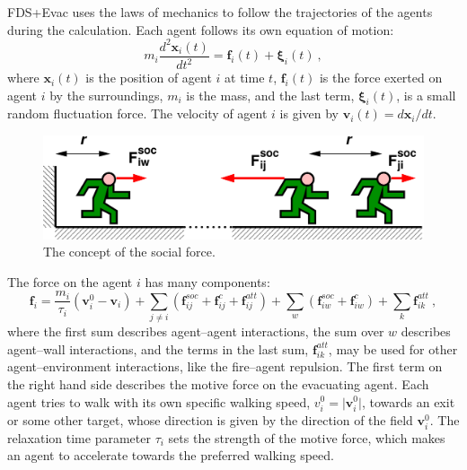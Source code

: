\documentclass[12pt,a4paper,final,twoside]{stylevk}
\begin{document}
FDS+Evac uses the laws of mechanics to follow the trajectories of the
agents during the calculation.  Each agent follows its own equation of
motion:
%
\begin{equation}\label{Eq_motion}
   m_i \frac{d^2 \mathbf{x}_i (t)}{dt^2} = \mathbf{f}_i (t)  +
  {\boldsymbol  \xi}_i (t) ~,  
\end{equation}
%
where $\mathbf{x}_i (t)$ is the position of agent $i$ at time $t$,
$\mathbf{f}_i (t)$ is the force exerted on agent $i$ by the
surroundings, $m_i$ is the mass, and the last term, ${\boldsymbol
  \xi}_i (t)$, is a small random fluctuation force.  The velocity of
agent $i$ is given by $\mathbf{v}_i (t) = d\mathbf{x}_i/dt$.

%
\begin{figure}[tb]
  \centerline{\includegraphics[clip=true, width=120mm]{FIGURES/voimakuvat_Poster}}
  \caption{The concept of the social force.}\label{Fig_SocForce}
\end{figure}
%

The force on the agent $i$ has many components:
%
\begin{equation}\label{Eq_force}
  \mathbf{f}_i = \frac{m_i}{\tau_i} \left( \mathbf{v}_i^0 -
    \mathbf{v}_i\right) + \sum_{j \ne i} \left( \mathbf{f}_{ij}^{soc}
    + \mathbf{f}_{ij}^{c} + \mathbf{f}_{ij}^{att} \right) + \sum_{w}
  \left( \mathbf{f}^{soc}_{iw} + \mathbf{f}^{c}_{iw} \right) + \sum_{k}
  \mathbf{f}_{ik}^{att} ~,
\end{equation}
%
where the first sum describes agent--agent interactions, the sum over
$w$ describes agent--wall interactions, and the terms in the last sum,
$\mathbf{f}_{ik}^{att}$, may be used for other agent--environment
interactions, like the fire--agent repulsion.  The first term on the
right hand side describes the motive force on the evacuating agent.
Each agent tries to walk with its own specific walking speed, $v^0_i =
\vert \mathbf{v}_i^0 \vert$, towards an exit or some other target,
whose direction is given by the direction of the field $
\mathbf{v}_i^0 $.  The relaxation time parameter $\tau_i$ sets the
strength of the motive force, which makes an agent to accelerate
towards the preferred walking speed.
\end{document}

